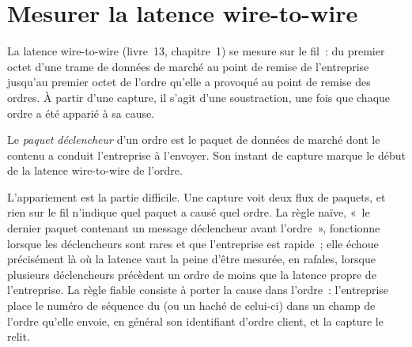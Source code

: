 \label{lst:nw:capturing-and-monitoring-the-network:pcap}

\section{Mesurer la latence wire-to-wire}

La latence wire-to-wire (livre~13, chapitre~1) se mesure sur le fil~: du premier octet d'une trame de données de marché au point
de remise de l'entreprise jusqu'au premier octet de l'ordre qu'elle a provoqué au point de remise des ordres. À partir d'une capture, il s'agit d'une soustraction, une fois que chaque ordre a été
apparié à sa cause.

\begin{definition}\label{def:nw:capturing-and-monitoring-the-network:trigger}
Le \emph{paquet déclencheur} d'un ordre est le paquet de données de marché dont le contenu a conduit
l'entreprise à l'envoyer. Son instant de capture marque le début de la latence wire-to-wire de l'ordre.
\end{definition}

L'appariement est la partie difficile. Une capture voit deux flux de paquets, et rien sur le fil n'indique quel paquet a causé quel ordre.
La règle naïve, «~le dernier paquet contenant un message déclencheur avant l'ordre~», fonctionne lorsque les déclencheurs sont rares et que l'entreprise est rapide~;
elle échoue précisément là où la latence vaut la peine d'être mesurée, en rafales, lorsque plusieurs déclencheurs précèdent un ordre de moins que la latence propre de l'entreprise.
La règle fiable consiste à porter la cause dans l'ordre~: l'entreprise place le numéro de séquence du  (ou un haché de celui-ci) dans un champ
de l'ordre qu'elle envoie, en général son identifiant d'ordre client, et la capture le relit.

